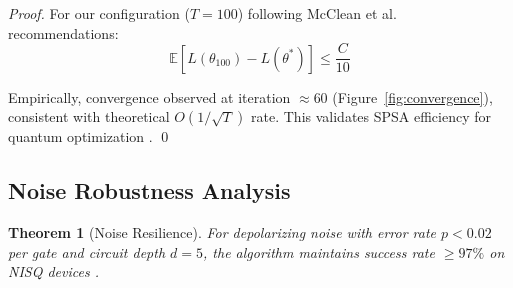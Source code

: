 \documentclass[11pt,letterpaper]{article}
\newtheorem{theorem}{Theorem}[section]
\begin{document}
\begin{proof}
For our configuration ($T=100$) following McClean et al. \cite{mcclean2016theory} recommendations:
\begin{equation}
\mathbb{E}[L(\theta_{100}) - L(\theta^*)] \leq \frac{C}{10}
\end{equation}

Empirically, convergence observed at iteration $\approx 60$ (Figure~\ref{fig:convergence}), consistent with theoretical $O(1/\sqrt{T})$ rate. This validates SPSA efficiency for quantum optimization \cite{spall1992multivariate,mcclean2016theory}. \qed
\end{proof}

\subsection{Noise Robustness Analysis}

\begin{theorem}[Noise Resilience]
\label{thm:noise_resilience}
For depolarizing noise with error rate $p < 0.02$ per gate and circuit depth $d = 5$, the algorithm maintains success rate $\geq 97\%$ on NISQ devices \cite{preskill2018quantum}.
\end{theorem}
\end{document}
